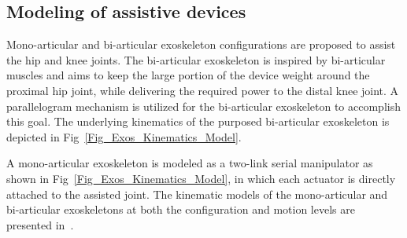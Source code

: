 \documentclass[10pt,letterpaper]{article}
\begin{document}
\begin{figure*}[b!]
	\centering
	\hfil
	\caption{\small{\textbf{Kinematics of assistive devices.} A parallelogram is used to implement the kinematics of the bi-articular exoskeleton, while the mono-articular exoskeleton is modeled as a two-link serial manipulator. Symbols $q_A$ to $q_D$ represent the hip and knee joint angles, respectively. Bodies $Torso$, $A$, $D$ represent the torso (depicted as grounded for simplicity of analysis), the upper leg, and the lower leg of the user. Bodies $B$ and $C$ are the links used to implement the symmetric parallelogram mechanism. Symbols $L_A$ to $L_E$ stand for the lengths of the upper leg and the lower leg, respectively.}} %
	\label{Fig_Exos_Kinematics_Model}
\end{figure*}

\subsection*{Modeling of assistive devices}

Mono-articular and bi-articular exoskeleton configurations are proposed to assist the hip and knee joints. The bi-articular exoskeleton is inspired by bi-articular muscles and  aims to keep the large portion of the device weight around the proximal hip joint, while delivering the required power to the distal knee joint. A parallelogram mechanism is utilized for the bi-articular exoskeleton to accomplish this goal. The underlying kinematics of the purposed bi-articular exoskeleton is depicted in Fig~\ref{Fig_Exos_Kinematics_Model}.

A mono-articular exoskeleton is modeled as a two-link serial manipulator as shown in Fig~\ref{Fig_Exos_Kinematics_Model}, in which each actuator is directly attached to the assisted joint. The kinematic models of the mono-articular and bi-articular exoskeletons at both the configuration and motion levels are presented in~.
\end{document}
